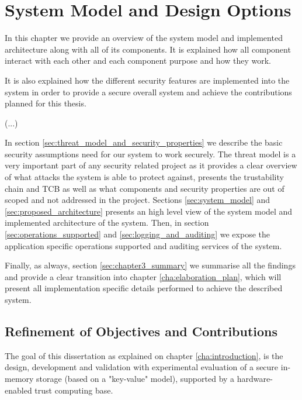 
\chapter{System Model and Design Options}
\label{cha:system_model_and_design_options}

In this chapter we provide an overview of the system model and implemented architecture along with all of its components. It is explained how all component interact with each other and each component purpose and how they work.

It is also explained how the different security features are implemented into the system in order to provide a secure overall system and achieve the contributions planned for this thesis.

(...)

In section \ref{sec:threat_model_and_security_properties} we describe the basic security assumptions need for our system to work securely. The threat model is a very important part of any security related project as it provides a clear overview of what attacks the system is able to protect against, presents the trustability chain and \gls{TCB} as well as what components and  security properties are out of scoped and not addressed in the project.
Sections \ref{sec:system_model} and \ref{sec:proposed_architecture} presents an high level view of the system model and implemented architecture of the system. Then, in section \ref{sec:operations_supported} and \ref{sec:logging_and_auditing} we expose the application specific operations supported and auditing services of the system.

Finally, as always, section \ref{sec:chapter3_summary} we summarise all the findings and provide a clear transition into chapter \ref{cha:elaboration_plan}, which will present all implementation specific details performed to achieve the described system.

\section{Refinement of Objectives and Contributions} %
\label{sec:refinement_of_objectives_and_contributions}

The goal of this dissertation as explained on chapter \ref{cha:introduction}, is the design, development and validation with experimental evaluation of a secure in-memory storage (based on a "key-value" model), supported by a hardware-enabled trust computing base.

